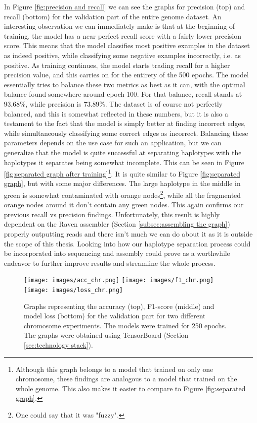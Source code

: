 \documentclass[times, utf8, diplomski, english]{fer_eng}
\begin{document}
In Figure \ref{fig:precision and recall} we can see the graphs for precision (top) and recall (bottom) for the validation part of the entire genome dataset. An interesting observation we can immediately make is that at the beginning of training, the model has a near perfect recall score with a fairly lower precision score. This means that the model classifies most positive examples in the dataset as indeed positive, while classifying some negative examples incorrectly, i.e. as positive. As training continues, the model starts trading recall for a higher precision value, and this carries on for the entirety of the 500 epochs. The model essentially tries to balance these two metrics as best as it can, with the optimal balance found somewhere around epoch 100. For that balance, recall stands at 93.68\%, while precision is 73.89\%. The dataset is of course not perfectly balanced, and this is somewhat reflected in these numbers, but it is also a testament to the fact that the model is simply better at finding incorrect edges, while simultaneously classifying some correct edges as incorrect. Balancing these parameters depends on the use case for such an application, but we can generalize that the model is quite successful at separating haplotypes with the haplotypes it separates being somewhat incomplete. This can be seen in Figure \ref{fig:separated graph after training}\footnote{Although this graph belongs to a model that trained on only one chromosome, these findings are analogous to a model that trained on the whole genome. This also makes it easier to compare to Figure \ref{fig:separated graph}.}. It is quite similar to Figure \ref{fig:separated graph}, but with some major differences. The large haplotype in the middle in green is somewhat contaminated with orange nodes\footnote{One could say that it was "fuzzy".}, while all the fragmented orange nodes around it don't contain any green nodes. This again confirms our previous recall vs precision findings. Unfortunately, this result is highly dependent on the Raven assembler (Section \ref{subsec:assembling the graph}) properly outputting reads and there isn't much we can do about it as it is outside the scope of this thesis. Looking into how our haplotype separation process could be incorporated into sequencing and assembly could prove as a worthwhile endeavor to further improve results and streamline the whole process.

\begin{figure}
	\centering
	\texttt{[image: images/acc\_chr.png]}
	\texttt{[image: images/f1\_chr.png]}
	\texttt{[image: images/loss\_chr.png]}
	\caption[Accuracy,f1-score and loss graph for different chromosomes]{Graphs representing the accuracy (top), F1-score (middle) and model loss (bottom) for the validation part for two different chromosome experiments. The models were trained for 250 epochs. The graphs were obtained using TensorBoard (Section \ref{sec:technology stack}).}
	\label{fig:accuracy, f1 score and loss chr}
\end{figure}
\end{document}
